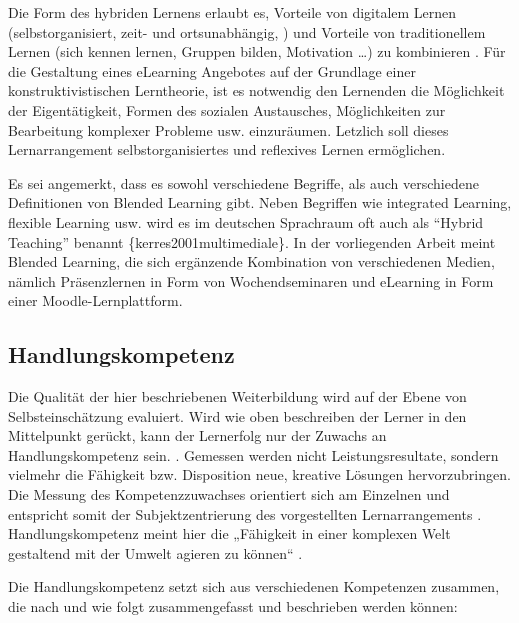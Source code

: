 \documentclass[12pt, bibliography=totoc]{scrartcl}
\begin{document}
Die Form des hybriden Lernens erlaubt es, Vorteile von digitalem Lernen
(selbstorganisiert, zeit- und ortsunabhängig, ) und Vorteile von
traditionellem Lernen (sich kennen lernen, Gruppen bilden, Motivation
\ldots) zu kombinieren \parencite{Zumbach2010}. Für die Gestaltung eines
eLearning Angebotes auf der Grundlage einer konstruktivistischen
Lerntheorie, ist es notwendig den Lernenden die Möglichkeit der
Eigentätigkeit, Formen des sozialen Austausches, Möglichkeiten zur
Bearbeitung komplexer Probleme usw. einzuräumen.
Letzlich soll dieses Lernarrangement
selbstorganisiertes und reflexives Lernen ermöglichen.

Es sei angemerkt, dass es sowohl verschiedene Begriffe, als auch
verschiedene Definitionen von Blended Learning gibt. Neben Begriffen wie
integrated Learning, flexible Learning usw. wird es im deutschen
Sprachraum oft auch als \enquote{Hybrid Teaching} benannt
\parencite{Oliver2005}\{kerres2001multimediale\}. In der vorliegenden
Arbeit meint Blended Learning, die sich ergänzende Kombination von
verschiedenen Medien, nämlich Präsenzlernen in Form von Wochendseminaren
und eLearning in Form einer Moodle-Lernplattform.

\subsection{Handlungskompetenz}\label{handlungskompetenz}

Die Qualität der hier beschriebenen Weiterbildung wird auf der Ebene von
Selbsteinschätzung evaluiert. Wird wie oben beschreiben der Lerner in
den Mittelpunkt gerückt, kann der Lernerfolg nur der Zuwachs an
Handlungskompetenz sein. \parencite[4]{Ehlers2002}. Gemessen werden
nicht Leistungsresultate, sondern vielmehr die Fähigkeit bzw.
Disposition neue, kreative Lösungen hervorzubringen. Die Messung des
Kompetenzzuwachses orientiert sich am Einzelnen und entspricht somit der
Subjektzentrierung des vorgestellten Lernarrangements
\parencite{ErpenbeckRosenstiel200305}. Handlungskompetenz meint hier die
„Fähigkeit in einer komplexen Welt gestaltend mit der Umwelt agieren zu
können`` \parencite[4]{Ehlers2002}.

Die Handlungskompetenz setzt sich aus verschiedenen Kompetenzen
zusammen, die nach \textcite{ErpenbeckRosenstiel200305} und
\textcite{Braun2008} wie folgt zusammengefasst und beschrieben werden
können:
\end{document}
